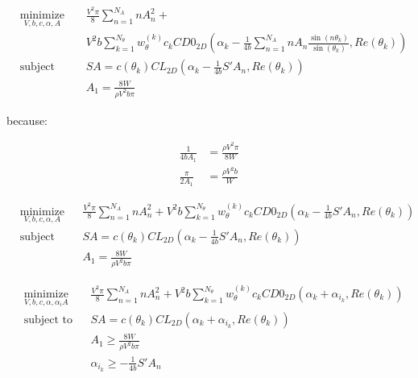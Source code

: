 \documentclass[letterpaper,12pt]{article}
\begin{document}
\begin{align}
	& \underset{V, b, c, \alpha, A}{\text{minimize}}
	& & \frac{V^2 \pi}{8}\sum_{n=1}^{N_A} n A_{n}^2 + \nonumber \\
	&&&  V^2 b  \sum_{k=1}^{N_{\theta}} w_{\theta}^{(k)} c_k CD0_{2D}\left( 
		\alpha_k - 
		\frac {1}{4b} \sum_{n=1}^{N_A} n A_n \frac{ \sin(n\theta_k) }{\sin(\theta_k)} , Re(\theta_k)
		\right) \label{obj1} \\
	& \text{subject to}
	& & SA =  c(\theta_k)CL_{2D} \left( \alpha_k - \frac {1}{4b} S' A_n , Re(\theta_k)\right)  \label{llcon1}\\
	& &  & A_1 = \frac{8W}{\rho V^2 b \pi} \label{wcon1}
\end{align}

because:

\begin{align*}
	\frac{1}{4bA_1} &= \frac{\rho V^2 \pi}{8W} \\
	\frac{\pi}{2A_1} &= \frac{\rho V^2 b}{ W} 
\end{align*}

\begin{align}
	& \underset{V, b, c, \alpha, A}{\text{minimize}}
	& & \frac{V^2 \pi}{8}\sum_{n=1}^{N_A} n A_{n}^2 +
	  V^2 b  \sum_{k=1}^{N_{\theta}} w_{\theta}^{(k)} c_k CD0_{2D}\left( 
		\alpha_k - \frac {1}{4b} S' A_n, Re(\theta_k)
		\right) \label{obj1} \\
	& \text{subject to}
	& & SA =  c(\theta_k)CL_{2D} \left( \alpha_k - \frac {1}{4b} S' A_n , Re(\theta_k)\right)  \label{llcon1}\\
	& &  & A_1 = \frac{8W}{\rho V^2 b \pi} \label{wcon1}
\end{align}


\begin{align}
	& \underset{V, b, c, \alpha, \alpha_i A}{\text{minimize}}
	& & \frac{V^2 \pi}{8}\sum_{n=1}^{N_A} n A_{n}^2 +
	  V^2 b  \sum_{k=1}^{N_{\theta}} w_{\theta}^{(k)} c_k CD0_{2D}\left( 
		\alpha_k +\alpha_{i_k}, Re(\theta_k)
		\right) \label{obj2} \\
	& \text{subject to}
	& & SA =  c(\theta_k)CL_{2D} \left( \alpha_k + \alpha_{i_k} , Re(\theta_k)\right)  \label{llcon1}\\
	& &  & A_1 \geq \frac{8W}{\rho V^2 b \pi} \label{wcon2}\\
	& &  & \alpha_{i_k}\geq - \frac {1}{4b} S' A_n \label{aindcon2}
\end{align}
\end{document}
